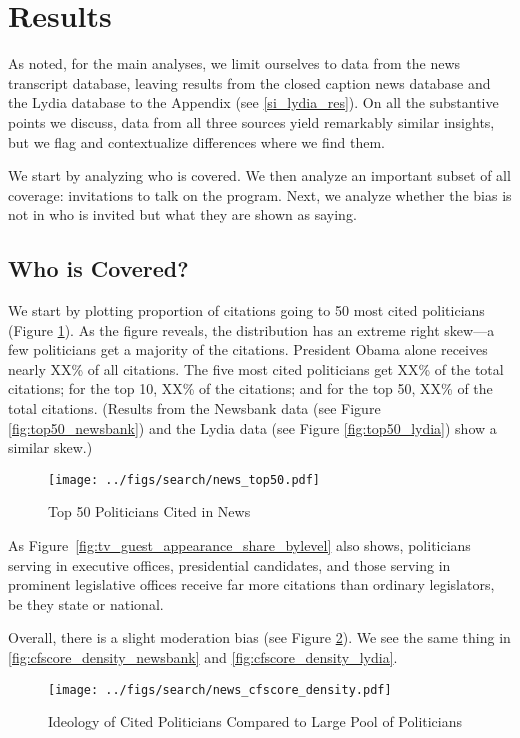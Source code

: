 \documentclass[12pt, letterpaper]{article}
\begin{document}
\section*{Results}
As noted, for the main analyses, we limit ourselves to data from the news transcript database, leaving results from the closed caption news database and the Lydia database to the Appendix (see \ref{si_lydia_res}). On all the substantive points we discuss, data from all three sources yield remarkably similar insights, but we flag and contextualize differences where we find them.

We start by analyzing who is covered. We then analyze an important subset of all coverage: invitations to talk on the program. Next, we analyze whether the bias is not in who is invited but what they are shown as saying.

\subsection*{Who is Covered?}
We start by plotting proportion of citations going to 50 most cited politicians (Figure \ref{fig:top50_transcripts}). As the figure reveals, the distribution has an extreme right skew---a few politicians get a majority of the citations. President Obama alone receives nearly XX\% of all citations. The five most cited politicians get XX\% of the total citations; for the top 10, XX\% of the citations; and for the top 50, XX\% of the total citations. (Results from the Newsbank data (see Figure \ref{fig:top50_newsbank}) and the Lydia data (see Figure \ref{fig:top50_lydia}) show a similar skew.)

\begin{figure}[h]
  \centering
  \caption{Top 50 Politicians Cited in News}
  \texttt{[image: ../figs/search/news\_top50.pdf]}
  \label{fig:top50_transcripts}
\end{figure}

As Figure~\ref{fig:tv_guest_appearance_share_bylevel} also shows, politicians serving in executive offices, presidential candidates, and those serving in prominent legislative offices receive far more citations than ordinary legislators, be they state or national.

Overall, there is a slight moderation bias (see Figure \ref{fig:transcripts_cfscore_density}). We see the same thing in \ref{fig:cfscore_density_newsbank} and \ref{fig:cfscore_density_lydia}.

\begin{figure}[h]
  \centering
  \caption{Ideology of Cited Politicians Compared to Large Pool of Politicians}
  \texttt{[image: ../figs/search/news\_cfscore\_density.pdf]}
  \label{fig:transcripts_cfscore_density}
\end{figure}
\end{document}
